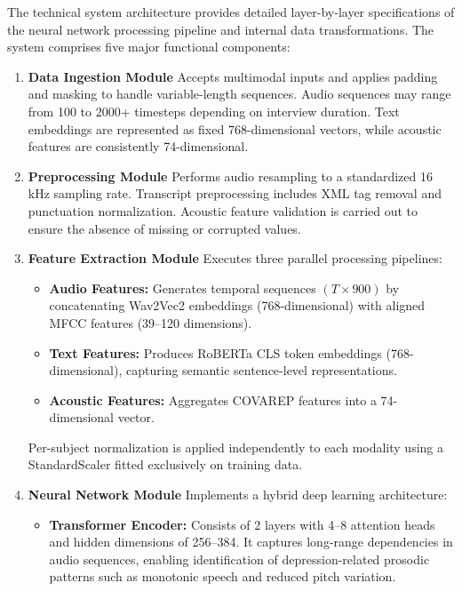 \documentclass[12pt]{article}
\begin{document}
	The technical system architecture provides detailed layer-by-layer specifications of the neural network processing pipeline and internal data transformations. The system comprises five major functional components: 
	\begin{enumerate}
    \item \textbf{Data Ingestion Module}  
    Accepts multimodal inputs and applies padding and masking to handle variable-length sequences. Audio sequences may range from 100 to 2000+ timesteps depending on interview duration. Text embeddings are represented as fixed 768-dimensional vectors, while acoustic features are consistently 74-dimensional.

    \item \textbf{Preprocessing Module}  
    Performs audio resampling to a standardized 16 kHz sampling rate. Transcript preprocessing includes XML tag removal and punctuation normalization. Acoustic feature validation is carried out to ensure the absence of missing or corrupted values.

    \item \textbf{Feature Extraction Module}  
    Executes three parallel processing pipelines:
    \begin{itemize}
        \item \textbf{Audio Features:} Generates temporal sequences $(T \times 900)$ by concatenating Wav2Vec2 embeddings (768-dimensional) with aligned MFCC features (39--120 dimensions).
        \item \textbf{Text Features:} Produces RoBERTa CLS token embeddings (768-dimensional), capturing semantic sentence-level representations.
        \item \textbf{Acoustic Features:} Aggregates COVAREP features into a 74-dimensional vector.
    \end{itemize}
    Per-subject normalization is applied independently to each modality using a StandardScaler fitted exclusively on training data.

    \item \textbf{Neural Network Module}  
    Implements a hybrid deep learning architecture:
    \begin{itemize}
        \item \textbf{Transformer Encoder:} Consists of 2 layers with 4--8 attention heads and hidden dimensions of 256--384. It captures long-range dependencies in audio sequences, enabling identification of depression-related prosodic patterns such as monotonic speech and reduced pitch variation.
        

\end{itemize}
\end{enumerate}
\end{document}
